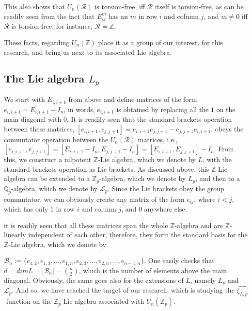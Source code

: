 \documentclass[12pt]{article}
\begin{document}
This also shows that $U_n(\mathcal{R})$ is torsion-free, iff $\mathcal{R}$ itself is torsion-free, as can be readily seen from the fact that $E_{ij}^m$ has an $m$ in row $i$ and column $j$, and $m\neq 0$ iff $\mathcal{R}$ is torsion-free, for instance, $\mathcal{R}=\mathbb{Z}$.\par
These facts, regarding $U_n(\mathbb{Z})$ place it as a group of our interest, for this research, and bring us next to its associated Lie algebra.
\subsection{The Lie algebra $L_p$}
We start with $E_{i,i+1}$ from above and define matrices of the form $e_{i,i+1}=E_{i,i+1}-I_n$, in words, $e_{i,i+1}$ is obtained by replacing all the $1$ on the main diagonal with $0$. It is readily seen that the standard brackets operation between these matrices, $[e_{i,i+1},e_{j,j+1}]=e_{i,i+1}e_{j,j+1}-e_{j,j+1}e_{i,i+1}$, obeys the commutator operation between the $U_n(\mathcal{R})$ matrices, i.e., $[e_{i,i+1},e_{j,j+1}]=[E_{i,i+1}-I_n,E_{j,j+1}-I_n]=[E_{i,i+1},E_{j,j+1}]-I_n$. From this, we construct a nilpotent $\mathbb{Z}$-Lie algebra, which we denote by $L$, with the standard brackets operation as Lie brackets. As discussed above, this $\mathbb{Z}$-Lie algebra can be extended to a $\mathbb{Z}_p$-algebra, which we denote by $L_p$, and then to a $\mathbb{Q}_p$-algebra, which we denote by $\mathcal{L}_p$.
Since the Lie brackets obey the group commutator, we can obviously create any matrix of the form $e_{ij}$, where $i<j$, which has only $1$ in row $i$ and column $j$, and $0$ anywhere else.\par
it is readily seen that all these matrices span the whole $\mathbb{Z}$-algebra and are $\mathbb{Z}$-linearly independent of each other, therefore, they form the standard basis for the $\mathbb{Z}$-Lie algebra, which we denote by\par $\mathcal{B}_n:=\{e_{1,2},e_{1,3},\dots,e_{1,n},e_{2,3},\dots,e_{2,n},\dots,e_{n-1,n}\}$. One easily checks that $d=dimL=|\mathcal{B}_n|=\binom{n}{2}$, which is the number of elements above the main diagonal. Obviously, the same goes also for the extensions of $L$, namely $L_p$ and $\mathcal{L}_p$. And so, we have reached the target of our research, which is studying the $\hat{\zeta_{L,p}}$-function on the $\mathbb{Z}_p$-Lie algebra associated with $U_n(\mathbb{Z}_p)$.
\end{document}

